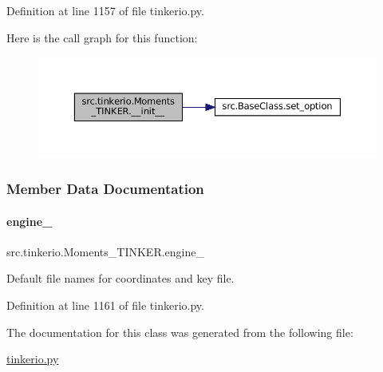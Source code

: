Definition at line 1157 of file tinkerio.\+py.

Here is the call graph for this function\+:
\nopagebreak
\begin{figure}[H]
\begin{center}
\leavevmode
\includegraphics[width=350pt]{classsrc_1_1tinkerio_1_1Moments__TINKER_af89fa02fb9a6ce5f975f17128e86b89d_cgraph}
\end{center}
\end{figure}


\subsubsection{Member Data Documentation}
\mbox{\label{classsrc_1_1tinkerio_1_1Moments__TINKER_aae027fa6152ecc3939a3a47336a24ec1}} 
\paragraph{\texorpdfstring{engine\+\_\+}{engine\_}}
{\footnotesize\ttfamily src.\+tinkerio.\+Moments\+\_\+\+T\+I\+N\+K\+E\+R.\+engine\+\_\+}



Default file names for coordinates and key file. 



Definition at line 1161 of file tinkerio.\+py.



The documentation for this class was generated from the following file\+:\begin{DoxyCompactItemize}
\item 
\hyperlink{tinkerio_8py}{tinkerio.\+py}\end{DoxyCompactItemize}
